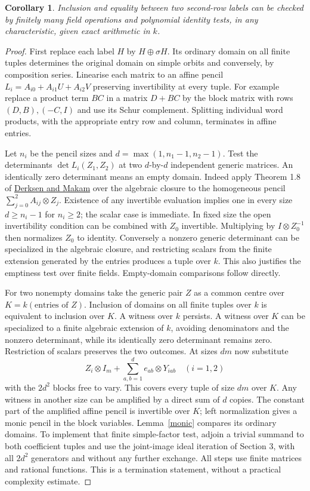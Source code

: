 \documentclass[11pt]{article}
\newtheorem{corollary}[theorem]{Corollary}
\begin{document}
\begin{corollary}\label{finite}
Inclusion and equality between two second-row labels can be checked by
finitely many field operations and polynomial identity tests, in any
characteristic, given exact arithmetic in $k$.
\end{corollary}
\begin{proof}
First replace each label $H$ by $H\oplus\sigma H$. Its ordinary domain
on all finite tuples determines the original domain on simple orbits
and conversely, by composition series. Linearise each matrix to an affine
pencil $L_i=A_{i0}+A_{i1}U+A_{i2}V$ preserving invertibility at every tuple.
For example replace a product term $BC$ in a matrix $D+BC$ by the block
matrix with rows $(D,B),(-C,I)$ and use its Schur complement. Splitting
individual word products, with the appropriate entry row and column,
terminates in affine entries.

Let $n_i$ be the pencil sizes and $d=\max(1,n_1-1,n_2-1)$. Test the
determinants $\det L_i(Z_1,Z_2)$ at two $d$-by-$d$ independent generic
matrices. An identically zero determinant means an empty domain.
Indeed apply Theorem 1.8 of
\href{https://arxiv.org/abs/1512.03393}{Derksen and Makam} over the
algebraic closure to the homogeneous pencil
$\sum_{j=0}^2 A_{ij}\otimes Z_j$. Existence of any invertible evaluation
implies one in every size $d\ge n_i-1$ for $n_i\ge2$; the scalar
case is immediate. In fixed size the open invertibility condition can
be combined with $Z_0$ invertible. Multiplying by $I\otimes Z_0^{-1}$
then normalizes $Z_0$ to identity. Conversely a nonzero generic determinant
can be specialized in the algebraic closure, and restricting scalars from
the finite extension generated by the entries produces a tuple over $k$.
This also justifies the emptiness test over finite fields. Empty-domain
comparisons follow directly.

For two nonempty domains take the generic pair $Z$ as a common centre
over $K=k(\text{entries of }Z)$. Inclusion of domains on all finite tuples
over $k$ is equivalent to inclusion over $K$. A witness over $k$ persists.
A witness over $K$ can be specialized to a finite algebraic extension of
$k$, avoiding denominators and the nonzero determinant, while its identically
zero determinant remains zero. Restriction of scalars preserves the two
outcomes. At sizes $dm$ now substitute
\[
 Z_i\otimes I_m+\sum_{a,b=1}^d e_{ab}\otimes Y_{iab}
 \quad(i=1,2)
\]
with the $2d^2$ blocks free to vary. This covers every tuple of size $dm$
over $K$. Any witness in another size can be amplified by a direct sum of
$d$ copies. The constant part of the amplified affine pencil is invertible
over $K$; left normalization gives a monic pencil in the block variables.
Lemma~\ref{monic} compares its ordinary domains. To implement that finite
simple-factor test, adjoin a trivial summand to both coefficient tuples
and use the joint-image ideal iteration of Section 3, with all $2d^2$
generators and without any further exchange. All steps use finite matrices
and rational functions. This is a termination statement, without a
practical complexity estimate.
\end{proof}
\end{document}
